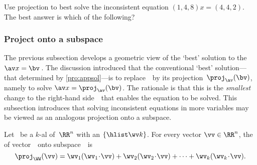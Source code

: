 \begin{activity}
Use projection to best solve the inconsistent equation \((1,4,8)x=(4,4,2)\). 
The best answer is which of the following?
\end{activity}











\subsubsection{Project onto a subspace}

The previous subsection develops a geometric view of the `best' solution to the  \(\av x=\bv\)\,.
The discussion introduced that the conventional `best' solution---that determined by \cref{pro:appsol}---is to replace~\bv\ by its projection~\(\proj_{\av}(\bv)\), namely to solve \(\av x=\proj_{\av}(\bv)\).
The rationale is that this is the \emph{smallest} change to the right-hand side~\bv\ that enables the equation to be solved.  
This subsection introduces that solving inconsistent equations in more variables may be viewed as an analogous projection onto a subspace.



\begin{definition} \label{def:orthproj}
Let \WW\ be a \(k\)-al  of~\(\RR^n\) with an  \(\{\hlist\wv k\}\).
For every vector \(\vv\in\RR^n\), the  of vector~\vv\ onto subspace~\WW\ is
\begin{equation*}
\proj_\WW(\vv)=\wv_1(\wv_1\cdot\vv)+\wv_2(\wv_2\cdot\vv)+\cdots+\wv_k(\wv_k\cdot\vv).
\end{equation*}
\end{definition}

